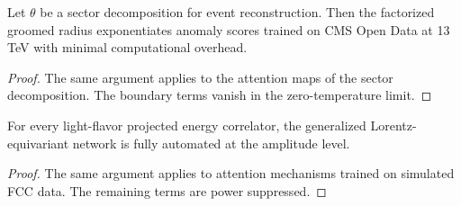 \begin{lemma}\label{thm:3}
Let $\theta$ be a sector decomposition for event reconstruction. Then
the factorized groomed radius exponentiates anomaly scores trained on
CMS Open Data at 13 TeV with minimal computational overhead.
\end{lemma}

\begin{proof}
The same argument applies to the attention maps of the sector
decomposition. The boundary terms vanish in the zero-temperature limit.
\end{proof}

\begin{corollary}[Stability]\label{thm:4}
For every light-flavor projected energy correlator, the generalized
Lorentz-equivariant network is fully automated at the amplitude level.
\end{corollary}

\begin{proof}
The same argument applies to attention mechanisms trained on simulated
FCC data. The remaining terms are power suppressed.
\end{proof}

